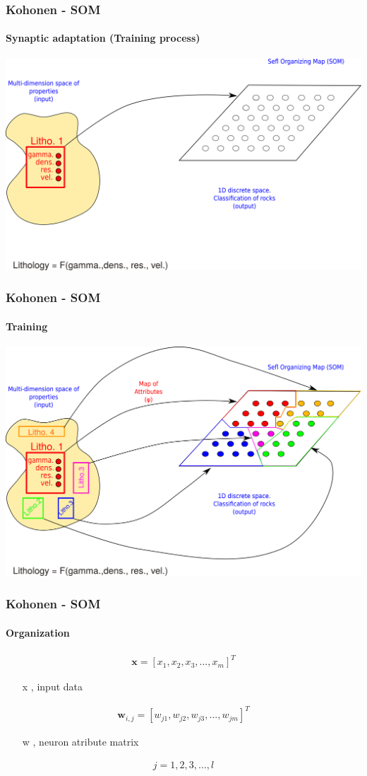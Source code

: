 \documentclass[aspectratio=10]{beamer} %
\begin{document}
\begin{frame}
 \frametitle{Kohonen - SOM}
 \framesubtitle{Synaptic adaptation (Training process)}
 \includegraphics[scale=0.5]{Imagens/Introkoho3.png} 
\end{frame}


\begin{frame}
	\frametitle{Kohonen - SOM}
	\framesubtitle{Training}
	\includegraphics[scale=0.5]{Imagens/Introkoho4.png} 
\end{frame}

\begin{frame}
	\frametitle{Kohonen - SOM}
	\framesubtitle{Organization}

	\begin{eqnarray}
	\textbf{x}=[x_{1}, x_{2}, x_{3}, ..., x_{m}]^{T} \nonumber
	\end{eqnarray}
	\pause
	\begin{itemize}
		\centering
		\item[x], input data 
		\pause
	\end{itemize}
	\begin{eqnarray}
	\textbf{w}_{i,j}= [w_{j1}, w_{j2}, w_{j3}, ..., w_{jm}]^{T} \nonumber
	\end{eqnarray}
	\pause
	\begin{itemize}
		\centering
		\item[w], neuron atribute matrix 
	\end{itemize}
	\begin{eqnarray}
	j=1,2,3,\hdots,l \nonumber
	\end{eqnarray}
\end{frame}
\end{document}
